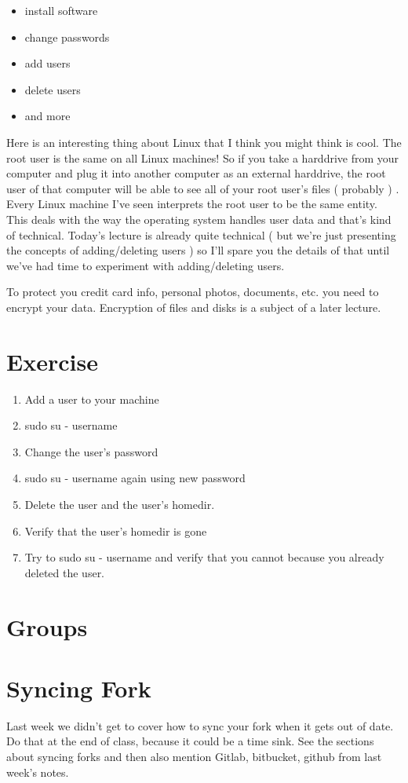 \documentclass[10pt]{article}
\begin{document}
\begin{itemize}
\item install software
\item change passwords
\item add users
\item delete users
\item and more
\end{itemize}

Here is an interesting thing about Linux that I think you might think is cool. The root user is the same on all Linux machines! So if you take a harddrive from your computer and plug it into another computer as an external harddrive, the root user of that computer will be able to see all of your root user's files ( probably ) . Every Linux machine I've seen interprets the root user to be the same entity. This deals with the way the operating system handles user data and that's kind of technical. Today's lecture is already quite technical ( but we're just presenting the concepts of adding/deleting users ) so I'll spare you the details of that until we've had time to experiment with adding/deleting users. 

To protect you credit card info, personal photos, documents, etc. you need to encrypt your data. Encryption of files and disks is a subject of a later lecture.

\section{{\color{red} Exercise }}
\begin{enumerate}
\item  Add a user to your machine
\item  sudo su - username
\item  Change the user's password
\item  sudo su - username again using new password
\item  Delete the user and the user's homedir. 
\item  Verify that the user's homedir is gone
\item  Try to sudo su - username and verify that you cannot because you already deleted the user.
\end{enumerate}

\section{Groups}


\section{Syncing Fork}
Last week we didn't get to cover how to sync your fork when it gets out of date.
Do that at the end of class, because it could be a time sink. See the sections
about syncing forks and then also mention Gitlab, bitbucket, github from last
week's notes.
\end{document}
